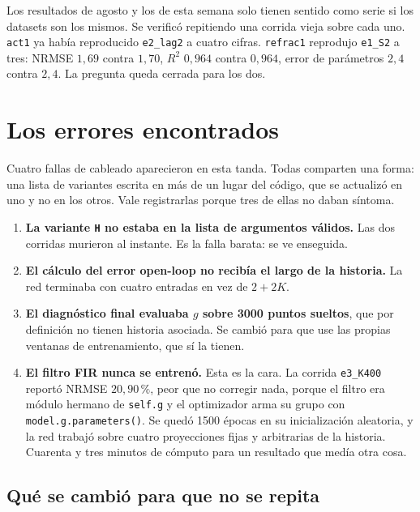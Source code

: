 \documentclass[11pt,a4paper]{article}
\begin{document}
Los resultados de agosto y los de esta semana solo tienen sentido como serie si
los datasets son los mismos. Se verificó repitiendo una corrida vieja sobre cada
uno. \texttt{act1} ya había reproducido \texttt{e2\_lag2} a cuatro cifras.
\texttt{refrac1} reprodujo \texttt{e1\_S2} a tres: NRMSE $1{,}69$ contra
$1{,}70$, $R^2$ $0{,}964$ contra $0{,}964$, error de parámetros $2{,}4$ contra
$2{,}4$. La pregunta queda cerrada para los dos.

\section{Los errores encontrados}

Cuatro fallas de cableado aparecieron en esta tanda. Todas comparten una forma:
una lista de variantes escrita en más de un lugar del código, que se actualizó
en uno y no en los otros. Vale registrarlas porque tres de ellas no daban
síntoma.

\begin{enumerate}
\item \textbf{La variante \texttt{H} no estaba en la lista de argumentos
  válidos.} Las dos corridas murieron al instante. Es la falla barata: se ve
  enseguida.
\item \textbf{El cálculo del error open-loop no recibía el largo de la
  historia.} La red terminaba con cuatro entradas en vez de $2 + 2K$.
\item \textbf{El diagnóstico final evaluaba $g$ sobre 3000 puntos sueltos}, que
  por definición no tienen historia asociada. Se cambió para que use las propias
  ventanas de entrenamiento, que sí la tienen.
\item \textbf{El filtro FIR nunca se entrenó.} Esta es la cara. La corrida
  \texttt{e3\_K400} reportó NRMSE $20{,}90\,\%$, peor que no corregir nada,
  porque el filtro era módulo hermano de \texttt{self.g} y el optimizador arma
  su grupo con \texttt{model.g.parameters()}. Se quedó 1500 épocas en su
  inicialización aleatoria, y la red trabajó sobre cuatro proyecciones fijas y
  arbitrarias de la historia. Cuarenta y tres minutos de cómputo para un
  resultado que medía otra cosa.
\end{enumerate}

\subsection{Qué se cambió para que no se repita}
\end{document}
